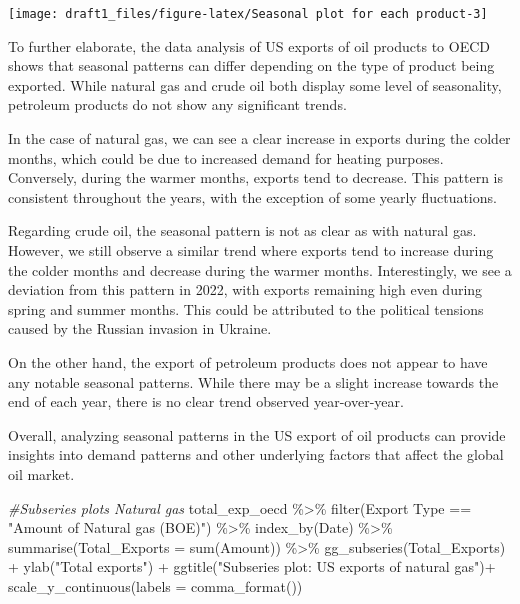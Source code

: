 \documentclass[
]{article}
\newenvironment{Shaded}{\begin{snugshade}}{\end{snugshade}}
\newcommand{\AttributeTok}[1]{\textcolor[rgb]{0.77,0.63,0.00}{#1}}
\newcommand{\CommentTok}[1]{\textcolor[rgb]{0.56,0.35,0.01}{\textit{#1}}}
\newcommand{\FunctionTok}[1]{\textcolor[rgb]{0.00,0.00,0.00}{#1}}
\newcommand{\NormalTok}[1]{#1}
\newcommand{\SpecialCharTok}[1]{\textcolor[rgb]{0.00,0.00,0.00}{#1}}
\newcommand{\StringTok}[1]{\textcolor[rgb]{0.31,0.60,0.02}{#1}}
\begin{document}
\begin{center}\texttt{[image: draft1\_files/figure-latex/Seasonal plot for each product-3]} \end{center}

To further elaborate, the data analysis of US exports of oil products to
OECD shows that seasonal patterns can differ depending on the type of
product being exported. While natural gas and crude oil both display
some level of seasonality, petroleum products do not show any
significant trends.

In the case of natural gas, we can see a clear increase in exports
during the colder months, which could be due to increased demand for
heating purposes. Conversely, during the warmer months, exports tend to
decrease. This pattern is consistent throughout the years, with the
exception of some yearly fluctuations.

Regarding crude oil, the seasonal pattern is not as clear as with
natural gas. However, we still observe a similar trend where exports
tend to increase during the colder months and decrease during the warmer
months. Interestingly, we see a deviation from this pattern in 2022,
with exports remaining high even during spring and summer months. This
could be attributed to the political tensions caused by the Russian
invasion in Ukraine.

On the other hand, the export of petroleum products does not appear to
have any notable seasonal patterns. While there may be a slight increase
towards the end of each year, there is no clear trend observed
year-over-year.

Overall, analyzing seasonal patterns in the US export of oil products
can provide insights into demand patterns and other underlying factors
that affect the global oil market.

\begin{Shaded}
\begin{Highlighting}[]
\CommentTok{\#Subseries plots Natural gas}
\NormalTok{total\_exp\_oecd }\SpecialCharTok{\%\textgreater{}\%} \FunctionTok{filter}\NormalTok{(}\StringTok{\textasciigrave{}}\AttributeTok{Export Type}\StringTok{\textasciigrave{}} \SpecialCharTok{==} \StringTok{"Amount of Natural gas (BOE)"}\NormalTok{) }\SpecialCharTok{\%\textgreater{}\%} 
  \FunctionTok{index\_by}\NormalTok{(Date) }\SpecialCharTok{\%\textgreater{}\%} 
  \FunctionTok{summarise}\NormalTok{(}\AttributeTok{Total\_Exports =} \FunctionTok{sum}\NormalTok{(}\StringTok{\textasciigrave{}}\AttributeTok{Amount}\StringTok{\textasciigrave{}}\NormalTok{)) }\SpecialCharTok{\%\textgreater{}\%} 
  \FunctionTok{gg\_subseries}\NormalTok{(Total\_Exports) }\SpecialCharTok{+} 
  \FunctionTok{ylab}\NormalTok{(}\StringTok{"Total exports"}\NormalTok{) }\SpecialCharTok{+} 
  \FunctionTok{ggtitle}\NormalTok{(}\StringTok{"Subseries plot: US exports of natural gas"}\NormalTok{)}\SpecialCharTok{+}
  \FunctionTok{scale\_y\_continuous}\NormalTok{(}\AttributeTok{labels =} \FunctionTok{comma\_format}\NormalTok{())}
\end{Highlighting}
\end{Shaded}
\end{document}
